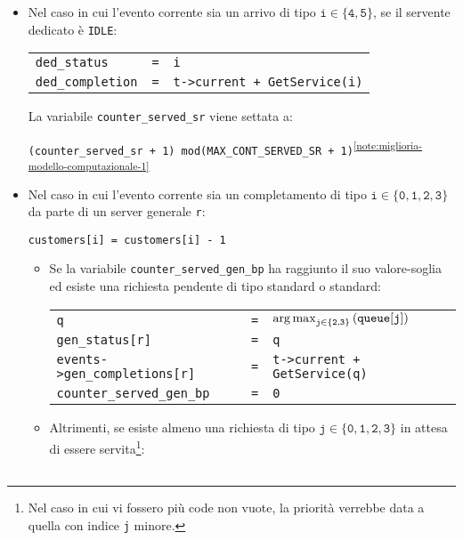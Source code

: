 \begin{enumerate}[label=Step \arabic*), align=left, leftmargin=*]
\begin{itemize}
\item Nel caso in cui l'evento corrente sia un arrivo di tipo $\mathtt{i \in \lbrace 4, 5 \rbrace}$, se il servente dedicato è \texttt{IDLE}:
\begin{center}
\begin{tabular}{l l l}
\texttt{ded\_status} & \texttt{=} & \texttt{i} \\
\texttt{ded\_completion} & \texttt{=} & \texttt{t->current + GetService(i)}
\end{tabular}
\end{center}
{\color{purple}La variabile \texttt{counter\_served\_sr} viene settata a:
\begin{center}
\texttt{(counter\_served\_sr + 1) mod(MAX\_CONT\_SERVED\_SR + 1)}\textsuperscript{\ref{note:miglioria-modello-computazionale-1}}
\end{center}}
\item Nel caso in cui l'evento corrente sia un completamento di tipo $\mathtt{i \in \lbrace 0, 1, 2, 3 \rbrace}$ da parte di un server generale \texttt{r}:
\begin{center}
\texttt{customers[i] = customers[i] - 1}
\end{center}
\begin{itemize}
\item {\color{purple}Se la variabile \texttt{counter\_served\_gen\_bp} ha raggiunto il suo valore-soglia ed esiste una richiesta pendente di tipo \uo{} standard o \pp{} standard:
\begin{center}
\begin{tabular}{l l l}
\texttt{q} & \texttt{=} & $\mathtt{\operatorname*{arg\,max}_{j \in \lbrace 2, 3 \rbrace}{\left(queue[j]\right)}}$ \\
\texttt{gen\_status[r]} & \texttt{=} & \texttt{q} \\
\texttt{events->gen\_completions[r]} & \texttt{=} & \texttt{t->current + GetService(q)} \\
\texttt{counter\_served\_gen\_bp} & \texttt{=} & \texttt{0}
\end{tabular}
\end{center}}
\item {\color{purple}Altrimenti,} se esiste almeno una richiesta di tipo $\mathtt{j \in \lbrace 0, 1, 2, 3 \rbrace}$ in attesa di essere servita\footnote{\label{note:miglioria-modello-computazionale-2}Nel caso in cui vi fossero più code non vuote, la priorità verrebbe data a quella con indice \texttt{j} minore.}:
\begin{center}
\begin{tabular}{l l l}

\end{tabular}
\end{center}
\end{itemize}
\end{itemize}
\end{enumerate}
